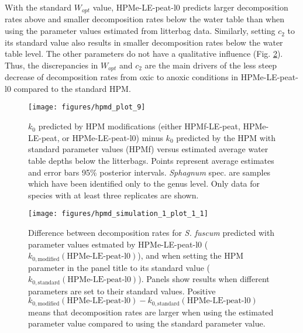 \documentclass[
  12pt,
]{article}
\begin{document}
With the standard \(W_{opt}\) value, HPMe-LE-peat-l0 predicts larger decomposition rates above and smaller decomposition rates below the water table than when using the parameter values estimated from litterbag data. Similarly, setting \(c_2\) to its standard value also results in smaller decomposition rates below the water table level. The other parameters do not have a qualitative influence (Fig. \ref{fig:out-sdm-parameters-standard-vs-estimated-p1}). Thus, the discrepancies in \(W_{opt}\) and \(c_2\) are the main drivers of the less steep decrease of decomposition rates from oxic to anoxic conditions in HPMe-LE-peat-l0 compared to the standard HPM.



\begin{figure}[H]

{\centering \texttt{[image: figures/hpmd\_plot\_9]} 

}

\caption{\(k_0\) predicted by HPM modifications (either HPMf-LE-peat, HPMe-LE-peat, or HPMe-LE-peat-l0) minus \(k_0\) predicted by the HPM with standard parameter values (HPMf) versus estimated average water table depths below the litterbags. Points represent average estimates and error bars 95\% posterior intervals. \emph{Sphagnum} spec. are samples which have been identified only to the genus level. Only data for species with at least three replicates are shown.}\label{fig:out-p-hpmd-plot-9}
\end{figure}



\begin{figure}[H]

{\centering \texttt{[image: figures/hpmd\_simulation\_1\_plot\_1\_1]} 

}

\caption{Difference between decomposition rates for \emph{S. fuscum} predicted with parameter values estmated by HPMe-LE-peat-l0 (\(k_{0,\text{modified}}(\text{HPMe-LE-peat-l0})\)), and when setting the HPM parameter in the panel title to its standard value (\(k_{0,\text{standard}}(\text{HPMe-LE-peat-l0})\)). Panels show results when different parameters are set to their standard values. Positive \(k_{0,\text{modified}}(\text{HPMe-LE-peat-l0}) - k_{0,\text{standard}}(\text{HPMe-LE-peat-l0})\) means that decomposition rates are larger when using the estimated parameter value compared to using the standard parameter value.}\label{fig:out-sdm-parameters-standard-vs-estimated-p1}
\end{figure}
\end{document}
